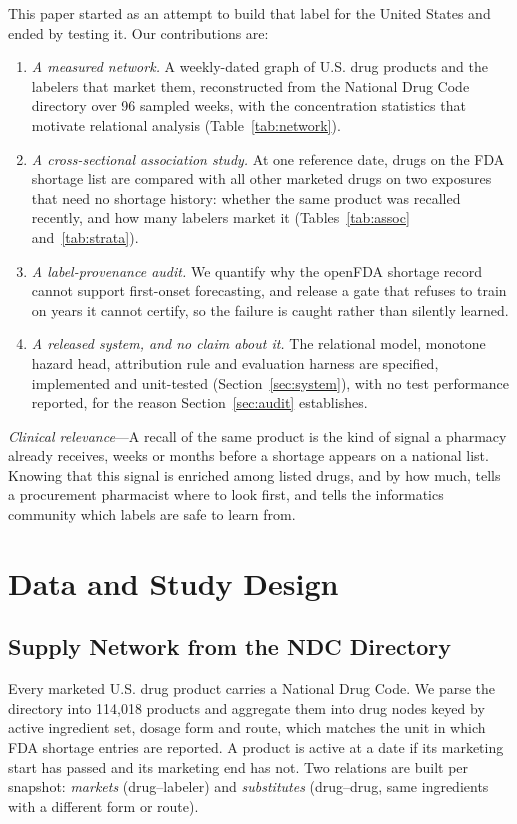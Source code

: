 \documentclass[conference,letterpaper]{IEEEtran}
\begin{document}
This paper started as an attempt to build that label for the United States and
ended by testing it. Our contributions are:
\begin{enumerate}
\item \emph{A measured network.} A weekly-dated graph of U.S. drug products and
the labelers that market them, reconstructed from the National Drug Code
directory \cite{ndc} over 96 sampled weeks, with the concentration statistics
that motivate relational analysis (Table~\ref{tab:network}).
\item \emph{A cross-sectional association study.} At one reference date, drugs
on the FDA shortage list are compared with all other marketed drugs on two
exposures that need no shortage history: whether the same product was recalled
recently, and how many labelers market it (Tables~\ref{tab:assoc}
and~\ref{tab:strata}).
\item \emph{A label-provenance audit.} We quantify why the openFDA shortage
record cannot support first-onset forecasting, and release a gate that refuses
to train on years it cannot certify,   so the failure is caught rather than
silently learned.
\item \emph{A released system, and no claim about it.} The relational model,
monotone hazard head, attribution rule and evaluation harness are specified,
implemented and unit-tested (Section~\ref{sec:system}), with no test performance
reported, for the reason Section~\ref{sec:audit} establishes.
\end{enumerate}

\emph{Clinical relevance}---A recall of the same product is the kind of signal a
pharmacy already receives, weeks or months before a shortage appears on a
national list. Knowing that this signal is enriched among listed drugs, and by
how much, tells a procurement pharmacist where to look first, and tells the
informatics community which labels are safe to learn from.

\section{Data and Study Design}

\subsection{Supply Network from the NDC Directory}
Every marketed U.S. drug product carries a National Drug Code. We parse the
directory \cite{ndc} into 114{,}018 products and aggregate them into drug nodes
keyed by active ingredient set, dosage form and route, which matches the unit in
which FDA shortage entries are reported. A product is active at a date if its
marketing start has passed and its marketing end has not. Two relations are
built per snapshot: \emph{markets} (drug--labeler) and \emph{substitutes}
(drug--drug, same ingredients with a different form or route).
\end{document}

